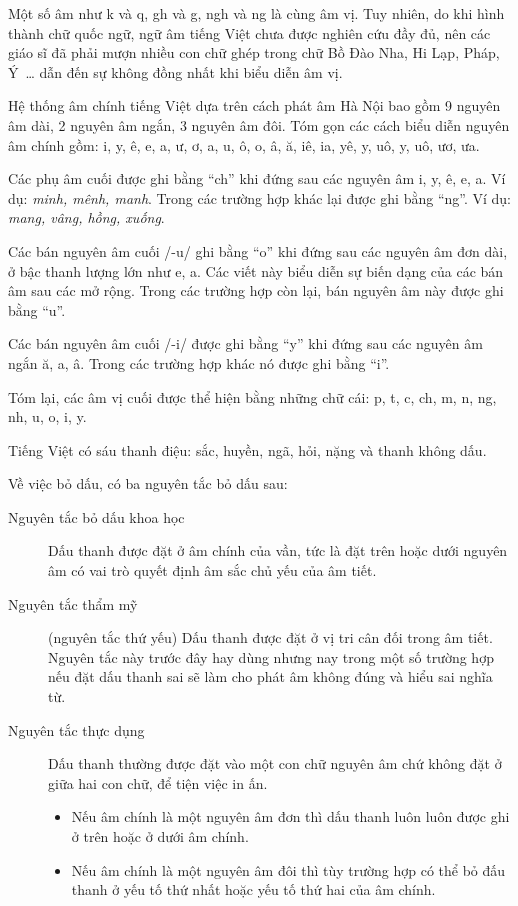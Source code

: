 \documentclass[a4paper,oneside,14pt]{extbook} %
\begin{document}
Một số âm như k và  q, gh và g, ngh và ng là cùng âm vị. Tuy nhiên, do
khi hình thành chữ quốc ngữ, ngữ âm tiếng Việt chưa được nghiên cứu
đầy đủ, nên các giáo sĩ đã phải mượn nhiều con chữ ghép trong chữ Bồ
Đào Nha, Hi Lạp, Pháp, Ý~\ldots{} dẫn đến sự không đồng nhất khi biểu
diễn âm vị.

Hệ thống âm chính tiếng Việt dựa trên cách phát âm Hà Nội bao gồm 9
nguyên âm dài, 2 nguyên âm ngắn, 3 nguyên âm đôi. Tóm gọn các cách
biểu diễn nguyên âm chính gồm: i, y, ê, e, a, ư, ơ, a, u, ô, o, â, ă,
iê, ia, yê, y, uô, y, uô, ươ, ưa.

Các phụ âm cuối được ghi bằng ``ch'' khi đứng sau các nguyên âm i, y,
ê, e, a. Ví dụ: {\em minh, mênh, manh}. Trong các trường hợp khác lại
được ghi bằng ``ng''. Ví dụ: {\em mang, vâng, hồng, xuống}.

Các bán nguyên âm cuối /-u/ ghi bằng ``o'' khi đứng sau các nguyên âm đơn
dài, ở bậc thanh lượng lớn như e, a. Các viết này biểu diễn sự biến
dạng của các bán âm sau các mở rộng. Trong các trường hợp còn lại, bán
nguyên âm này được ghi bằng ``u''.

Các bán nguyên âm cuối /-i/ được ghi bằng ``y'' khi đứng sau các
nguyên âm ngắn ă, a, â. Trong các trường hợp khác nó được ghi bằng
``i''.

Tóm lại, các âm vị cuối được thể hiện bằng những chữ cái: p, t, c, ch,
m, n, ng, nh, u, o, i, y.

Tiếng Việt có sáu thanh điệu: sắc, huyền, ngã, hỏi, nặng và thanh không dấu. 

Về việc bỏ dấu, có ba nguyên tắc bỏ dấu sau:
\begin{description}
\item[Nguyên tắc bỏ dấu khoa học] Dấu thanh được đặt ở âm chính của
  vần, tức là đặt trên hoặc dưới nguyên âm có vai trò quyết định âm
  sắc chủ yếu của âm tiết.
\item[Nguyên tắc thẩm mỹ] (nguyên tắc thứ yếu) Dấu thanh được đặt ở vị
  tri cân đối trong âm tiết. Nguyên tắc này trước đây hay dùng nhưng
  nay trong một số trường hợp nếu đặt dấu thanh sai sẽ làm cho phát âm
  không đúng và hiểu sai nghĩa từ.
\item[Nguyên tắc thực dụng] Dấu thanh thường được đặt vào một con chữ
  nguyên âm chứ không đặt ở giữa hai con chữ, để tiện việc in ấn.
  \begin{itemize}
  \item Nếu âm chính là một nguyên âm đơn thì dấu thanh luôn luôn được
  ghi ở trên hoặc ở dưới âm chính.
  \item Nếu âm chính là một nguyên âm đôi thì tùy trường hợp có thể bỏ
  đấu thanh ở yếu tố thứ nhất hoặc yếu tố thứ hai của âm chính.
  \end{itemize}
\end{description}
\end{document}
